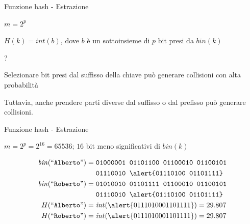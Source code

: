 \begin{frame}{Funzione hash - Estrazione}

\vspace{-9pt}
\begin{myboxtitle}[Estrazione]
\BIL
\item $m = 2^p$
\item $H(k) = \mathit{int}(b)$, dove $b$ è un sottoinsieme di $p$ bit presi da $\mathit{bin}(k)$
\EIL
\end{myboxtitle}

\begin{myboxtitle}[Problemi]
\begin{overprint}
?
\BIL
\item Selezionare bit presi dal suffisso della chiave può generare collisioni
con alta probabilità
\item Tuttavia, anche prendere parti diverse dal suffisso o dal prefisso può generare collisioni.
\EIL
\end{overprint}
\end{myboxtitle}
 
\end{frame}

\begin{frame}{Funzione hash - Estrazione}

\vspace{-9pt}
\begin{myboxtitle}[Esempio 1]
$m = 2^p = 2^{16} = 65536$; $16$ bit meno significativi di $\mathit{bin}(k)$

\begin{align*}
\mathit{bin}(``\texttt{Alberto}") = {} & \texttt{01000001  01101100  01100010  01100101} \\ 
&  \texttt{01110010  \alert{01110100  01101111}}\\
\mathit{bin}(``\texttt{Roberto}") = {} & \texttt{01010010  01101111  01100010  01100101} \\
&    \texttt{01110010  \alert{01110100  01101111}} \\
H(``\texttt{Alberto}") = {} & \mathit{int}(\alert{01110100  01101111}) = 29.807 \\
H(``\texttt{Roberto}") = {} & \mathit{int}(\alert{01110100  01101111}) = 29.807
\end{align*}
\end{myboxtitle}


\end{frame}


